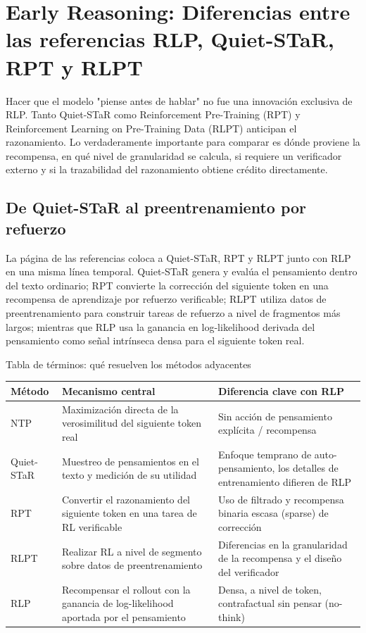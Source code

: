 \section{Early Reasoning: Diferencias entre las referencias RLP, Quiet-STaR, RPT y RLPT}

Hacer que el modelo "piense antes de hablar" no fue una innovación exclusiva de RLP. Tanto Quiet-STaR como Reinforcement Pre-Training (RPT) y Reinforcement Learning on Pre-Training Data (RLPT) anticipan el razonamiento. Lo verdaderamente importante para comparar es dónde proviene la recompensa, en qué nivel de granularidad se calcula, si requiere un verificador externo y si la trazabilidad del razonamiento obtiene crédito directamente.

\subsection{De Quiet-STaR al preentrenamiento por refuerzo}

La página de las referencias coloca a Quiet-STaR, RPT y RLPT junto con RLP en una misma línea temporal. Quiet-STaR genera y evalúa el pensamiento dentro del texto ordinario; RPT convierte la corrección del siguiente token en una recompensa de aprendizaje por refuerzo verificable; RLPT utiliza datos de preentrenamiento para construir tareas de refuerzo a nivel de fragmentos más largos; mientras que RLP usa la ganancia en log-likelihood derivada del pensamiento como señal intrínseca densa para el siguiente token real.


\begin{knowledgebox}{Tabla de términos: qué resuelven los métodos adyacentes}
\begin{tabularx}{\textwidth}{L{0.18\textwidth}X X}
\toprule
Método & Mecanismo central & Diferencia clave con RLP \\
\midrule
NTP & Maximización directa de la verosimilitud del siguiente token real & Sin acción de pensamiento explícita / recompensa \\
Quiet-STaR & Muestreo de pensamientos en el texto y medición de su utilidad & Enfoque temprano de auto-pensamiento, los detalles de entrenamiento difieren de RLP \\
RPT & Convertir el razonamiento del siguiente token en una tarea de RL verificable & Uso de filtrado y recompensa binaria escasa (sparse) de corrección \\
RLPT & Realizar RL a nivel de segmento sobre datos de preentrenamiento & Diferencias en la granularidad de la recompensa y el diseño del verificador \\
RLP & Recompensar el rollout con la ganancia de log-likelihood aportada por el pensamiento & Densa, a nivel de token, contrafactual sin pensar (no-think) \\
\bottomrule
\end{tabularx}
\end{knowledgebox}

